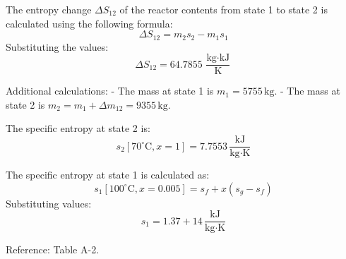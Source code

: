 The entropy change \( \Delta S_{12} \) of the reactor contents from state 1 to state 2 is calculated using the following formula:  
\[
\Delta S_{12} = m_2 s_2 - m_1 s_1
\]  
Substituting the values:  
\[
\Delta S_{12} = 64.7855 \, \frac{\text{kg} \cdot \text{kJ}}{\text{K}}
\]  

Additional calculations:  
- The mass at state 1 is \( m_1 = 5755 \, \text{kg} \).  
- The mass at state 2 is \( m_2 = m_1 + \Delta m_{12} = 9355 \, \text{kg} \).  

The specific entropy at state 2 is:  
\[
s_2 [70^\circ\text{C}, x = 1] = 7.7553 \, \frac{\text{kJ}}{\text{kg} \cdot \text{K}}
\]  

The specific entropy at state 1 is calculated as:  
\[
s_1 [100^\circ\text{C}, x = 0.005] = s_f + x (s_g - s_f)
\]  
Substituting values:  
\[
s_1 = 1.37 + 14 \, \frac{\text{kJ}}{\text{kg} \cdot \text{K}}
\]  

Reference: Table A-2.